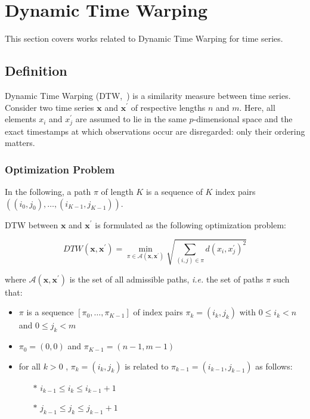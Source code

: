 \section{Dynamic Time Warping}
\label{sec:dtw}

This section covers works related to Dynamic Time Warping for time series.

\subsection{Definition}


Dynamic Time Warping (DTW,~\cite{sakoe1978dynamic}) is a similarity measure
between time series.
Consider two time series $\mathbf{x}$ and
$\mathbf{x}^\prime$ of respective lengths $n$ and
$m$.
Here, all elements $x_i$ and $x^\prime_j$ are assumed to lie in the same
$p$-dimensional space and the exact timestamps at which observations occur are
disregarded: only their ordering matters.

\subsubsection{Optimization Problem}

In the following, a path $\pi$ of length $K$ is a
sequence of $K$ index pairs
$\left((i_0, j_0), \dots , (i_{K-1}, j_{K-1})\right)$.

DTW between $\mathbf{x}$ and $\mathbf{x}^\prime$ is formulated as the following
optimization problem:

\begin{equation}
DTW(\mathbf{x}, \mathbf{x}^\prime) =
    \min_{\pi \in \mathcal{A}(\mathbf{x}, \mathbf{x}^\prime)}
        \sqrt{ \sum_{(i, j) \in \pi} d(x_i, x^\prime_j)^2 }
\label{eq:dtw}
\end{equation}

where $\mathcal{A}(\mathbf{x}, \mathbf{x}^\prime)$ is the set of all admissible
paths, \emph{i.e.} the set of paths $\pi$ such that:

\begin{itemize}
\item $\pi$ is a sequence $[\pi_0, \dots , \pi_{K-1}]$ of index pairs
  $\pi_k = (i_k, j_k)$ with $0 \leq i_k < n$ and $0 \leq j_k < m$
\item $\pi_0 = (0, 0)$ and $\pi_{K-1} = (n - 1, m - 1)$
\item for all $k > 0$ , $\pi_k = (i_k, j_k)$ is related to
  $\pi_{k-1} = (i_{k-1}, j_{k-1})$ as follows:
  \begin{itemize}
  \item[$\ast$] $i_{k-1} \leq i_k \leq i_{k-1} + 1$
  \item[$\ast$] $j_{k-1} \leq j_k \leq j_{k-1} + 1$
\end{itemize}
\end{itemize}


